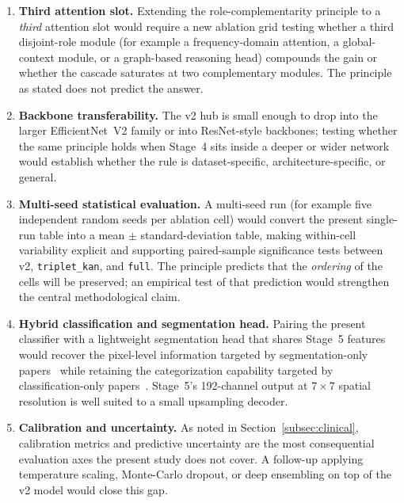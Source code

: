 \begin{enumerate}
  \item \textbf{Third attention slot.} Extending the role-complementarity
  principle to a \emph{third} attention slot would require a new ablation grid
  testing whether a third disjoint-role module (for example a
  frequency-domain attention, a global-context module, or a graph-based
  reasoning head) compounds the gain or whether the cascade saturates at two
  complementary modules. The principle as stated does not predict the answer.
  \item \textbf{Backbone transferability.} The v2 hub is small enough to drop
  into the larger EfficientNet~V2 family or into ResNet-style backbones;
  testing whether the same principle holds when Stage~4 sits inside a deeper or
  wider network would establish whether the rule is dataset-specific,
  architecture-specific, or general.
  \item \textbf{Multi-seed statistical evaluation.} A multi-seed run (for
  example five independent random seeds per ablation cell) would convert the
  present single-run table into a mean $\pm$ standard-deviation table, making
  within-cell variability explicit and supporting paired-sample significance
  tests between v2, \texttt{triplet\_kan}, and \texttt{full}. The principle
  predicts that the \emph{ordering} of the cells will be preserved; an
  empirical test of that prediction would strengthen the central methodological
  claim.
  \item \textbf{Hybrid classification and segmentation head.} Pairing the
  present classifier with a lightweight segmentation head that shares Stage~5
  features would recover the pixel-level information targeted by
  segmentation-only papers~\cite{ref15,ref26} while retaining the
  categorization capability targeted by classification-only
  papers~\cite{ref19,ref22}. Stage~5's 192-channel output at $7\times7$ spatial
  resolution is well suited to a small upsampling decoder.
  \item \textbf{Calibration and uncertainty.} As noted in
  Section~\ref{subsec:clinical}, calibration metrics and predictive uncertainty
  are the most consequential evaluation axes the present study does not cover.
  A follow-up applying temperature scaling, Monte-Carlo dropout, or deep
  ensembling on top of the v2 model would close this gap.
\end{enumerate}

